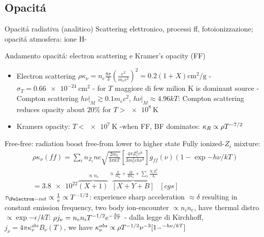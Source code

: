 \subsection{Opacit\'a}

\begin{frame}{Opacit\'a radiativa (analitico)}
Scattering elettronico, processi ff, fotoionizzazione; opacit\'a atmosfera: ione H-
\end{frame}

\begin{frame}{Andamento opacit\'a: electron scattering e Kramer's opacity (FF)}
\begin{itemize}
\item Electron scattering $\rho\kappa_{\nu}=n_e\frac{8\pi}{3}(\frac{e^2}{m_ec^2})^2=0.2(1+X)\si{\square\cm\per\gram}$ - $\sigma_T=\SI{0.66e-24}{\square\cm}$ - for $T$ maggiore di few milion K is dominant source - Compton scattering $h\nu|_M\gtrsim0.1 m_ec^2$, $h\nu|_M\approx4.96kT$: Compton scattering reduces opacity about $20\%$ for $T>\SI{e8}{\kelvin}$
\item Kramers opacity: $T<\SI{e7}{\kelvin}$ -when FF, BF dominates: $\kappa_R\propto\rho T^{-7/2}$
\end{itemize}
\begin{block}{Free-free: radiation boost free-\Pelectron from lower to higher state}
Fully ionized-$Z_i$ mixture: 
\begin{align*}
&\rho\kappa_{\nu}(ff)=\sum_in_{Z_i}ne\sqrt{\frac{2m_e}{3\pi kT}}[\frac{4\pi Z_i^2e^6}{3m_e^2ch\nu^3}]g_{ff}(\nu)(1-\exp{-h\nu/kT})\\
&=\num{3.8e22}\overbrace{(X+1)}^{\propto n_e}\overbrace{[X+Y+B]}^{\propto\frac{X}{m_u}+\frac{4Y}{4m_u}+\sum_i\frac{X_iZ_i^2}{A_i}}\ [\si{cgs}]
\end{align*}
$\tau_{\Pelectron-int}\propto\frac{1}{v}\propto T\expy{-1/2}$: \Pelectron experience sharp acceleration $\approx\delta$ resulting in constant emission frequency, two body ion-\Pelectron encounter $\propto n_in_e$, \Pelectron have thermal distro $\propto\exp{-\epsilon/kT}$: $\rho j_{\nu}=n_en_iT^{-1/2}e^{-\frac{h\nu}{kT}}$ - dalla legge di Kirchhoff, $j_{\nu}=4\pi\kappa_{\nu}^{abs}B_{\nu}(T)$, we have $\kappa_{\nu}^{abs}\propto\rho T^{-1/2}\nu^{-3}[1-^{-h\nu/kT}]$
\end{block}
\end{frame}

